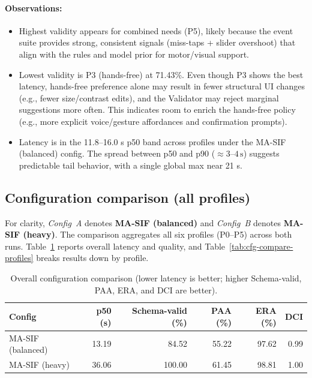 \paragraph{Observations:}
\begin{itemize}
    \item Highest validity appears for combined needs (P5), likely because the event suite provides strong, consistent signals (miss-taps + slider overshoot) that align with the rules and model prior for motor/visual support.
    \item Lowest validity is P3 (hands-free) at 71.43\%. Even though P3 shows the best latency, hands-free preference alone may result in fewer structural UI changes (e.g., fewer size/contrast edits), and the Validator may reject marginal suggestions more often. This indicates room to enrich the hands-free policy (e.g., more explicit voice/gesture affordances and confirmation prompts).
    \item Latency is in the 11.8--16.0 s p50 band across profiles under the MA-SIF (balanced) config. The spread between p50 and p90 ($\approx 3$--$4\,\mathrm{s}$) suggests predictable tail behavior, with a single global max near 21 s.
\end{itemize}

\subsection{Configuration comparison (all profiles)}
For clarity, \emph{Config~A} denotes \textbf{MA-SIF (balanced)} and \emph{Config~B} denotes \textbf{MA-SIF (heavy)}. The comparison aggregates all six profiles (P0–P5) across both runs. Table~\ref{tab:cfg-compare-overall} reports overall latency and quality, and Table~\ref{tab:cfg-compare-profiles} breaks results down by profile.

\begin{table}[ht]
\centering
\caption{Overall configuration comparison (lower latency is better; higher Schema-valid, PAA, ERA, and DCI are better).}
\label{tab:cfg-compare-overall}
\begin{tabular}{lrrrrr}
\toprule
\textbf{Config} & \textbf{p50 (s)} & \textbf{Schema-valid (\%)} & \textbf{PAA (\%)} & \textbf{ERA (\%)} & \textbf{DCI} \\
\midrule
MA-SIF (balanced) & 13.19 & 84.52 & 55.22 & 97.62 & 0.99 \\
MA-SIF (heavy)    & 36.06 & 100.00 & 61.45 & 98.81 & 1.00 \\
\bottomrule
\end{tabular}
\end{table}

